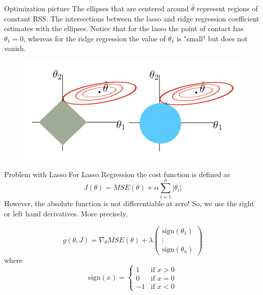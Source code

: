 \documentclass{beamer}
\begin{document}
\begin{frame}{Optimization picture}
	The ellipses that are centered around $\hat{\theta}$ represent regions of constant RSS. The intersections between the lasso and ridge regression coefficient estimates with the ellipses. Notice that for the lasso the point of contact has $\theta_1=0$, whereas for the ridge regression the value of $\theta_1$ is "small" but does not vanish.
		\begin{figure}[h]
		\centering
		\includegraphics[scale=0.5]{../../Figures/fig_lasso_ridge.png}
	\end{figure}
	
\end{frame}

\begin{frame}{Problem with Lasso}
For Lasso Regression the cost function is defined as
\begin{equation*}
	J(\theta)=MSE(\theta)+\alpha\sum_{i=1}^n |\theta_i|
\end{equation*}
However, the absolute function is not differentiable at zero! So, we use the right or left hand derivatives. More precisely,

\begin{equation*}
	g(\theta,J)= \nabla_\theta MSE (\theta)+ \lambda  
	\begin{pmatrix}
		\textrm{sign}(\theta_1)\\
		\vdots\\
		\textrm{sign}(\theta_n)
	\end{pmatrix}
\end{equation*}
where 
\begin{equation*}
	\textrm{sign}(x)= \begin{cases}
		1 & \textrm{if } x>0\\
		0 & \textrm{if } x=0\\
		-1 & \textrm{if  }x<0
	\end{cases}
\end{equation*}
\end{frame}
\end{document}
